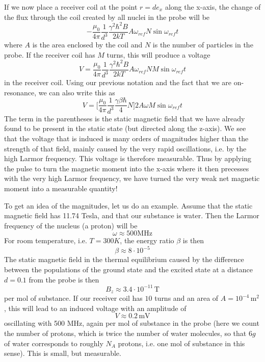 \documentclass[a4paper, draft]{article}
\theoremstyle{own}
\theoremstyle{remark}
\begin{document}
If we now place a receiver coil at the point $r = d e_x$ along the x-axis, the change of the flux through the coil created by all nuclei in the probe will be
$$
- \frac{\mu_0}{4\pi} \frac{1}{d^3} 
\frac{\gamma^2 \hbar^2 B}{2kT}
A \omega_{ref} N \sin \omega_{ref} t
$$
where $A$ is the area enclosed by the coil and $N$ is the number of particles in the probe. If the receiver coil has $M$ turns, this will produce a voltage
$$
V = \frac{\mu_0}{4\pi} \frac{1}{d^3} 
\frac{\gamma^2 \hbar^2 B}{2kT}
A \omega_{ref} N M \sin \omega_{ref} t
$$
in the receiver coil. Using our previous notation and the fact that we are on-resonance, we can also write this as
$$
V = \big[ \frac{\mu_0}{4\pi} \frac{1}{d^3}  \frac{\gamma \beta \hbar}{4} N \big]  2 A \omega  M \sin \omega_{ref} t
$$
The term in the parentheses is the static magnetic field that we have already found to be present in the static state (but directed along the z-axis). We see that the voltage that is induced is many orders of magnitudes higher than the strength of that field, mainly caused by the very rapid oscillations, i.e. by the high Larmor frequency. This voltage is therefore measurable. Thus by applying the pulse to turn the magnetic moment into the x-axis where it then precesses with the very high Larmor frequency, we have turned the very weak net magnetic moment into a measurable quantity! 

To get an idea of the magnitudes, let us do an example. Assume that the static magnetic field has 11.74 Tesla, and that our substance is water. Then the Larmor frequency of the nucleus (a proton) will be
$$
\omega \approx 500 \text{MHz}
$$
For room temperature, i.e. $T = 300 K$, the energy ratio $\beta$ is then
$$
\beta \approx 8 \cdot 10^{-5}
$$
The static magnetic field in the thermal equilibrium caused by the difference between the populations of the ground state and the excited state at a distance $d = 0.1$ from the probe is then
$$
B_z \approx 3.4 \cdot 10^{-11} \, \text{T}
$$
per mol of substance. If our receiver coil has $10$ turns and an area of $A = 10^{-4} \, \text{m}^2 $, this will lead to an induced voltage with an amplitude of
$$
V \approx 0.2 \, \text{mV}
$$
oscillating with 500 MHz, again per mol of substance in the probe (here we count the number of protons, which is twice the number of water molecules, so that $6 g$ of water corresponds to roughly $N_A$ protons, i.e. one mol of substance in this sense). This is small, but measurable. 
\end{document}
